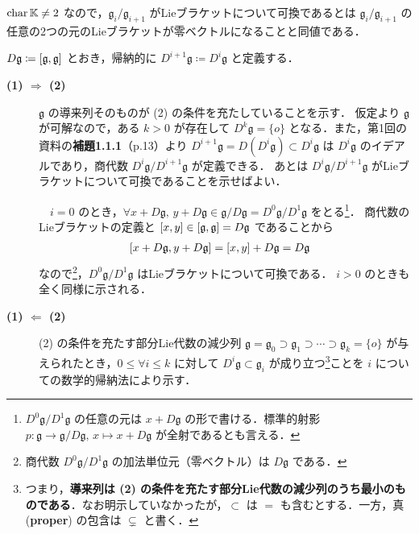 \documentclass{ltjsarticle}
\makeatletter
\theoremstyle{mystyle} %
\renewcommand{\proofname}{証明}
\renewenvironment{proof}[1][\proofname]{\par
    \pushQED{\qed}%
    \normalfont \topsep6\p@\@plus6\p@\relax
    \trivlist
    \item[\hskip\labelsep
        \itshape
    \textbf{\underline{#1}}]\ignorespaces
}{%
    \popQED\endtrivlist\@endpefalse
}
\numberwithin{equation}{section}
\newcommand{\lto}{\longrightarrow}
\newcommand{\lmto}{\longmapsto}
\makeatother
\begin{document}
\begin{marker}
    $\operatorname{char} \mathbb{K} \neq 2$ なので，$\mathfrak{g}_i / \mathfrak{g}_{i+1}$ がLieブラケットについて可換であるとは $\mathfrak{g}_i / \mathfrak{g}_{i+1}$ の任意の2つの元のLieブラケットが零ベクトルになることと同値である．
\end{marker}

\begin{proof}
    $D \mathfrak{g} \coloneqq \comm{\mathfrak{g}}{\mathfrak{g}}$ とおき，帰納的に $D^{i+1} \mathfrak{g} \coloneqq D^{i} \mathfrak{g}$ と定義する．
    \begin{description}
        \item[\textbf{(1) $\bm{\Longrightarrow}$ (2)}] $\mathfrak{g}$ の導来列そのものが (2) の条件を充たしていることを示す．
        仮定より $\mathfrak{g}$ が可解なので，ある $k > 0$ が存在して $D^k \mathfrak{g} = \{o\}$ となる．また，第1回の資料の\textbf{補題1.1.1}（p.13）より $D^{i+1}\mathfrak{g} = D (D^i \mathfrak{g}) \subset D^i \mathfrak{g}$ は $D^i \mathfrak{g}$ のイデアルであり，商代数 $D^i \mathfrak{g} / D^{i+1} \mathfrak{g}$ が定義できる．
        あとは $D^i \mathfrak{g} / D^{i+1} \mathfrak{g}$ がLieブラケットについて可換であることを示せばよい．
        
        　$i = 0$ のとき，$\forall x + D \mathfrak{g},\, y + D \mathfrak{g} \in \mathfrak{g} /  D \mathfrak{g} = D^0\mathfrak{g}/D^1 \mathfrak{g}$ をとる\footnote{$D^0\mathfrak{g}/D^1 \mathfrak{g}$ の任意の元は $x + D \mathfrak{g}$ の形で書ける．標準的射影 $p \colon \mathfrak{g} \lto \mathfrak{g} / D \mathfrak{g},\, x \lmto x + D\mathfrak{g}$ が全射であるとも言える．}．
        商代数のLieブラケットの定義と $\comm{x}{y} \in \comm{\mathfrak{g}}{\mathfrak{g}} = D \mathfrak{g}$ であることから
        \begin{align}
            \comm{x + D \mathfrak{g}}{y + D \mathfrak{g}} &= \comm{x}{y} + D \mathfrak{g}
            = D \mathfrak{g}
        \end{align}
        なので\footnote{商代数 $D^0\mathfrak{g}/D^1 \mathfrak{g}$ の加法単位元（零ベクトル）は $D \mathfrak{g}$ である．}，$D^0\mathfrak{g}/D^1 \mathfrak{g}$ はLieブラケットについて可換である．
        $i > 0$  のときも全く同様に示される．
        \item[\textbf{(1) $\bm{\Longleftarrow}$ (2)}] (2) の条件を充たす部分Lie代数の減少列 $\mathfrak{g} = \mathfrak{g}_0 \supset \mathfrak{g}_1 \supset \cdots \supset \mathfrak{g}_k = \{o\}$ が与えられたとき，$0 \le \forall i \le k$ に対して $D^i \mathfrak{g} \subset \mathfrak{g}_i$ が成り立つ\footnote{つまり，\textbf{導来列は (2) の条件を充たす部分Lie代数の減少列のうち最小のものである}．なお明示していなかったが，$\subset$ は $=$ も含むとする．一方，真 (\textbf{proper}) の包含は $\subsetneq$ と書く．}ことを $i$ についての数学的帰納法により示す．
        

\end{description}
\end{proof}
\end{document}
